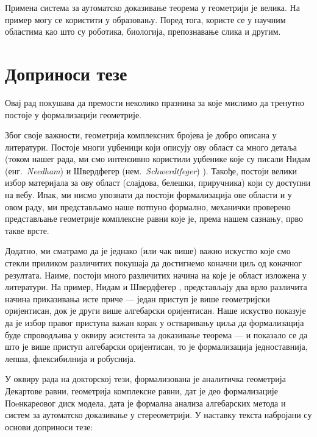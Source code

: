 Примена система за аутоматско доказивање теорема у геометрији је
велика. На пример могу се користити у образовању. Поред тога, користе
се у научним областима као што су роботика, биологија, препознавање
слика и другим.


\section{Доприноси тезе}

Овај рад покушава да премости неколико празнина за које мислимо да
тренутно постоје у формализацији геометрије.

Због своје важности, геометрија комплексних бројева је добро описана у
литератури. Постоје многи уџбеници који описују ову област са много
детаља (током нашег рада, ми смо интензивно користили уџбенике које су
писали Нидам (енг.~\emph{Needham}) \cite{needham} и Швердфегер
(нем.~\emph{Schwerdtfeger}) \cite{schwerdtfeger}).  Такође, постоји
велики избор материјала за ову област (слајдова, белешки, приручника)
који су доступни на вебу. Ипак, ми нисмо упознати да постоји
формализација ове области и у овом раду, ми представљамо наше потпуно
формално, механички проверено представљање геометрије комплексне равни
које је, према нашем сазнању, прво такве врсте.

Додатно, ми сматрамо да је једнако (или чак више) важно искуство које
смо стекли приликом различитих покушаја да достигнемо коначни циљ од
коначног резултата. Наиме, постоји много различитих начина на које је
област изложена у литератури. На пример, Нидам \cite{needham} и
Швердфегер \cite{schwerdtfeger}, представљају два врло различита
начина приказивања исте приче --- један приступ је више геометријски
оријентисан, док је други више алгебарски оријентисан. Наше искуство
показује да је избор правог приступа важан корак у остваривању циља да
формализација буде спроводљива у оквиру асистента за доказивање
теорема --- и показало се да што је више приступ алгебарски
оријентисан, то је формализација једноставнија, лепша, флексибилнија и
робуснија.


У оквиру рада на докторској тези, формализована је аналитичка
геометрија Декартове равни, геометрија комплексне равни, дат је део
формализације Поeнкареовог диск модела, дата је формална анализа
алгебарских метода и систем за аутоматско доказивање у
стереометрији. У наставку текста набројани су основи доприноси тезе:

